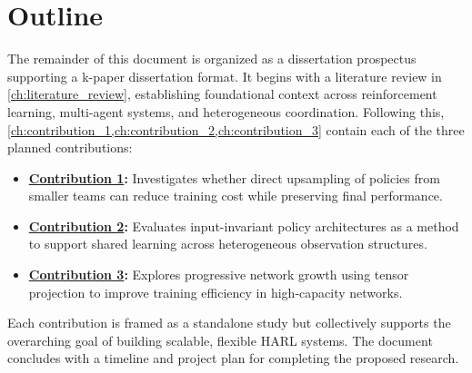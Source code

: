 \section{Outline}%

The remainder of this document is organized as a dissertation prospectus 
supporting a k-paper dissertation format. It begins with a literature review in 
\cref{ch:literature_review}, establishing foundational context across reinforcement 
learning, multi-agent systems, and heterogeneous coordination. 
Following this, \cref{ch:contribution_1,ch:contribution_2,ch:contribution_3} 
contain each of the three planned contributions:
\begin{itemize}
    \item \textbf{\hyperref[ch:contribution_1]{Contribution 1}:} Investigates whether direct 
        upsampling of policies from smaller teams can reduce training cost while preserving 
        final performance.
    \item \textbf{\hyperref[ch:contribution_2]{Contribution 2}:} Evaluates input-invariant 
        policy architectures as a method to support shared learning across heterogeneous 
        observation structures.
    \item \textbf{\hyperref[ch:contribution_3]{Contribution 3}:} Explores progressive network 
        growth using tensor projection to improve training efficiency in high-capacity networks.
\end{itemize}
Each contribution is framed as a standalone study but collectively supports 
the overarching goal of building scalable, flexible HARL systems. 
The document concludes with a timeline and project plan for completing the proposed research.